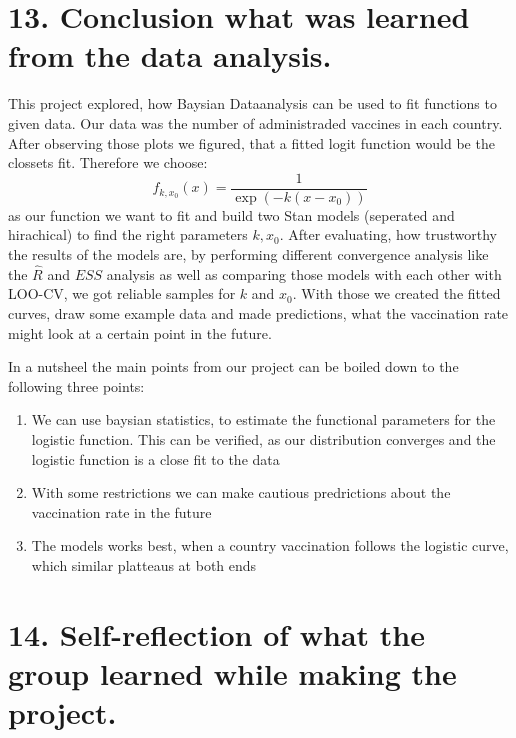 \documentclass[
]{article}
\begin{document}
\newpage

\hypertarget{conclusion-what-was-learned-from-the-data-analysis.}{%
\section{13. Conclusion what was learned from the data
analysis.}\label{conclusion-what-was-learned-from-the-data-analysis.}}

This project explored, how Baysian Dataanalysis can be used to fit
functions to given data. Our data was the number of administraded
vaccines in each country. After observing those plots we figured, that a
fitted logit function would be the clossets fit. Therefore we choose: \[
f_{k,x_0}(x) = \frac{1}{\operatorname{exp}(-k(x-x_0))}
\] as our function we want to fit and build two Stan models (seperated
and hirachical) to find the right parameters \(k,x_0\). After
evaluating, how trustworthy the results of the models are, by performing
different convergence analysis like the \(\hat{R}\) and \(ESS\) analysis
as well as comparing those models with each other with LOO-CV, we got
reliable samples for \(k\) and \(x_0\). With those we created the fitted
curves, draw some example data and made predictions, what the
vaccination rate might look at a certain point in the future.

In a nutsheel the main points from our project can be boiled down to the
following three points:

\begin{enumerate}
\def\labelenumi{\arabic{enumi}.}
\item
  We can use baysian statistics, to estimate the functional parameters
  for the logistic function. This can be verified, as our distribution
  converges and the logistic function is a close fit to the data
\item
  With some restrictions we can make cautious predrictions about the
  vaccination rate in the future
\item
  The models works best, when a country vaccination follows the logistic
  curve, which similar platteaus at both ends
\end{enumerate}

\newpage

\hypertarget{self-reflection-of-what-the-group-learned-while-making-the-project.}{%
\section{14. Self-reflection of what the group learned while making the
project.}\label{self-reflection-of-what-the-group-learned-while-making-the-project.}}
\end{document}
